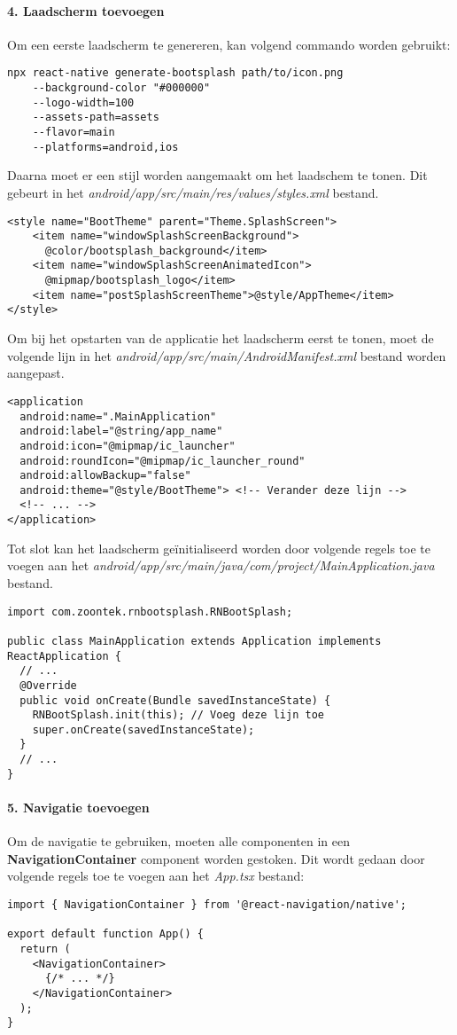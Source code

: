 \paragraph{4. Laadscherm toevoegen}
Om een eerste laadscherm te genereren, kan volgend commando worden gebruikt:
\begin{verbatim}
npx react-native generate-bootsplash path/to/icon.png
    --background-color "#000000" 
    --logo-width=100 
    --assets-path=assets 
    --flavor=main 
    --platforms=android,ios
\end{verbatim}
Daarna moet er een stijl worden aangemaakt om het laadschem te tonen. Dit gebeurt in 
het \textit{android/app/src/main/res/values/styles.xml} bestand.
\begin{verbatim}
<style name="BootTheme" parent="Theme.SplashScreen">
    <item name="windowSplashScreenBackground">
      @color/bootsplash_background</item>
    <item name="windowSplashScreenAnimatedIcon">
      @mipmap/bootsplash_logo</item>
    <item name="postSplashScreenTheme">@style/AppTheme</item>
</style>
\end{verbatim}
Om bij het opstarten van de applicatie het laadscherm eerst te tonen, moet de volgende 
lijn in het \textit{android/app/src/main/AndroidManifest.xml} bestand worden aangepast.
\begin{verbatim}
<application
  android:name=".MainApplication"
  android:label="@string/app_name"
  android:icon="@mipmap/ic_launcher"
  android:roundIcon="@mipmap/ic_launcher_round"
  android:allowBackup="false"
  android:theme="@style/BootTheme"> <!-- Verander deze lijn -->
  <!-- ... -->
</application>
\end{verbatim}
Tot slot kan het laadscherm geïnitialiseerd worden door volgende regels toe te voegen aan het
\textit{android/app/src/main/java/com/project/MainApplication.java} bestand.
\begin{verbatim}
import com.zoontek.rnbootsplash.RNBootSplash;

public class MainApplication extends Application implements ReactApplication {
  // ...
  @Override
  public void onCreate(Bundle savedInstanceState) {
    RNBootSplash.init(this); // Voeg deze lijn toe
    super.onCreate(savedInstanceState);
  }
  // ...
}
\end{verbatim}

\paragraph{5. Navigatie toevoegen}
Om de navigatie te gebruiken, moeten alle componenten in een 
\textbf{NavigationContainer} component worden gestoken. Dit wordt gedaan door volgende regels toe te voegen
aan het \textit{App.tsx} bestand:
\begin{verbatim}
import { NavigationContainer } from '@react-navigation/native';

export default function App() {
  return (
    <NavigationContainer>
      {/* ... */}
    </NavigationContainer>
  );
}
\end{verbatim}

